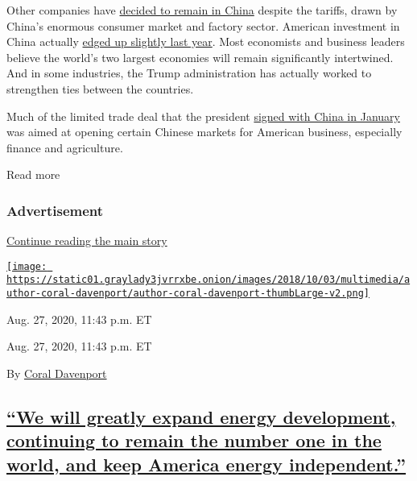 Other companies have
\href{https://www.nytimes3xbfgragh.onion/2020/07/22/business/economy/coronavirus-globalization-jobs-supply-chain-china.html}{decided
to remain in China} despite the tariffs, drawn by China's enormous
consumer market and factory sector. American investment in China
actually
\href{https://rhg.com/research/two-way-street-us-china-investment-trends-2020-update/}{edged
up slightly last year}. Most economists and business leaders believe the
world's two largest economies will remain significantly intertwined. And
in some industries, the Trump administration has actually worked to
strengthen ties between the countries.

Much of the limited trade deal that the president
\href{https://www.nytimes3xbfgragh.onion/2020/01/15/business/economy/china-trade-deal.html}{signed
with China in January} was aimed at opening certain Chinese markets for
American business, especially finance and agriculture.

Read more

\hypertarget{advertisement}{%
\subsubsection{Advertisement}\label{advertisement}}

\protect\hyperlink{after-dfp-ad-mid1}{Continue reading the main story}

\href{https://www.nytimes3xbfgragh.onion/by/coral-davenport}{\texttt{[image: https://static01.graylady3jvrrxbe.onion/images/2018/10/03/multimedia/author-coral-davenport/author-coral-davenport-thumbLarge-v2.png]}}

Aug. 27, 2020, 11:43 p.m. ET

Aug. 27, 2020, 11:43 p.m. ET

By \href{https://www.nytimes3xbfgragh.onion/by/coral-davenport}{Coral
Davenport}

\hypertarget{we-will-greatly-expand-energy-development-continuing-to-remain-the-number-one-in-the-world-and-keep-america-energy-independent}{%
\subsection{\texorpdfstring{\protect\hyperlink{we-will-greatly-expand-energy-development-continuing-to-remain-the-number-one-in-the-world-and-keep-america-energy-independent}{``We
will greatly expand energy development, continuing to remain the number
one in the world, and keep America energy
independent.''}}{``We will greatly expand energy development, continuing to remain the number one in the world, and keep America energy independent.''}}\label{we-will-greatly-expand-energy-development-continuing-to-remain-the-number-one-in-the-world-and-keep-america-energy-independent}}

